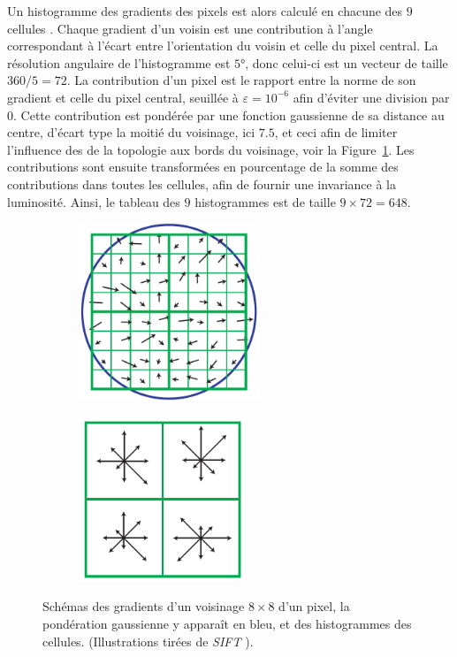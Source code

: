 \documentclass[
	a4paper, %
	10pt, %
	unnumberedsections, %
	twoside, %
]{LTJournalArticle}
\begin{document}
Un histogramme des gradients des pixels est alors calculé en chacune des $9$ cellules .
Chaque gradient d'un voisin est une contribution à l'angle correspondant à l'écart entre l'orientation du voisin et celle du pixel central.
La résolution angulaire de l'histogramme est $5$°, donc celui-ci est un vecteur de taille
$360 / 5 = 72$.
La contribution d'un pixel
est le rapport entre la norme de son gradient et celle du pixel central,
seuillée à $\varepsilon = 10^{-6}$ afin d'éviter une division par $0$.
Cette contribution est pondérée par une fonction gaussienne de sa distance au centre,
d'écart type la moitié du voisinage, ici $7.5$, et ceci afin de limiter l'influence des
de la topologie aux bords du voisinage, voir la Figure~\ref{figure:lowe_desc_constr}.
Les contributions sont ensuite transformées en pourcentage
de la somme des contributions dans toutes les cellules, afin de fournir une invariance
à la luminosité. Ainsi, le tableau des $9$ histogrammes est de taille $9 \times 72 = 648$.

\begin{figure}[H]
	\centering
	\begin{subfigure}[H]{\columnwidth}
		\centering
		\includegraphics[width=0.6\textwidth]{images/lowe_grads.png}
	\end{subfigure}
	\begin{subfigure}[H]{\columnwidth}
		\centering
		\includegraphics[width=0.55\textwidth]{images/lowe_desc.png}
	\end{subfigure}
	\caption{Schémas des gradients d'un voisinage $8 \times 8$ d'un pixel, la pondération
		gaussienne y apparaît en bleu, et des histogrammes des cellules. (Illustrations tirées
		de \textit{SIFT} \autocite{Lowe:2004}).}
	\label{figure:lowe_desc_constr}
\end{figure}
\end{document}
